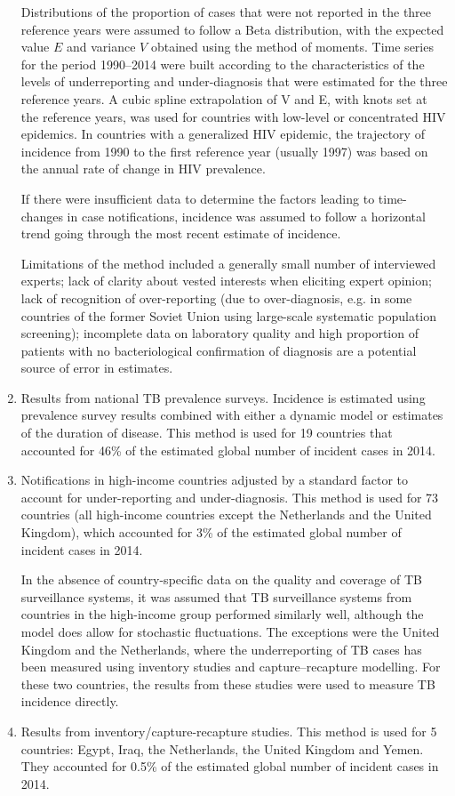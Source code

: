 \begin{enumerate}
Distributions of the proportion of cases that were not reported in the three reference years were assumed to follow a Beta distribution, with the expected value $E$ and variance $V$ obtained using the method of moments\cite{Renyi2007}. Time series for the period 1990–2014 were built according to the characteristics of the levels of underreporting and under-diagnosis that were estimated for the three reference years. A cubic spline extrapolation of V and E, with knots set at the reference years, was used for countries with low-level or concentrated HIV epidemics. In countries with a generalized HIV epidemic, the trajectory of incidence from 1990 to the first reference year (usually 1997) was based on the annual rate of change in HIV prevalence. 

If there were insufficient data to determine the factors leading to time-changes in case notifications, incidence was assumed to follow a horizontal trend going through the most recent estimate of incidence. 

Limitations of the method included a generally small number of interviewed experts; lack of clarity about vested interests when eliciting expert opinion; lack of recognition of over-reporting (due to over-diagnosis,  e.g. in some countries of the former Soviet Union using large-scale systematic population screening); 
incomplete data on laboratory quality and high proportion of patients with no bacteriological confirmation of diagnosis are a potential source of error in estimates.


\item {Results from national TB prevalence surveys.} Incidence is estimated using prevalence survey results combined with either a dynamic model or estimates of the duration of disease. This method is used for 19 countries that accounted for 46\% of the estimated global number of incident cases in 2014.

\item {Notifications in high-income countries adjusted by a standard factor to account for under-reporting and under-diagnosis.} This method is used for 73 countries (all high-income countries except the Netherlands and the United Kingdom), which accounted for 3\% of the estimated global number of incident cases in 2014.

In the absence of country-specific data on the quality and coverage of TB surveillance systems, it was assumed that TB surveillance systems from countries in the high-income group performed similarly well, although the model does allow for stochastic fluctuations. The exceptions were the United Kingdom and the Netherlands, where the underreporting of TB cases has been measured using inventory studies and capture–recapture modelling\cite{Anderson2010}\cite{17156496}. For these two countries, the results from these studies were used to measure TB incidence directly.


\item {Results from inventory/capture-recapture studies.} This method is used for 5 countries: Egypt, Iraq, the Netherlands, the United Kingdom and Yemen. They accounted for 0.5\% of the estimated global number of incident cases in 2014. 
\end{enumerate}




  
  
  
  
  
  